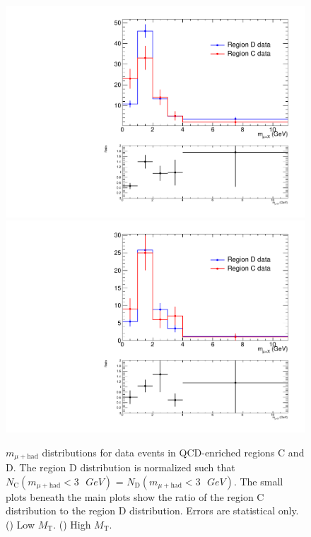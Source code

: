 \begin{figure}[hbtp]
  \begin{center}
    \includegraphics[width=\cmsFigWidth]{figures/regCDataVsRegDData_lowMT}
    \includegraphics[width=\cmsFigWidth]{figures/regCDataVsRegDData_highMT}
    \caption{$m_{\mu+\text{had}}$ distributions for data events in QCD-enriched regions C and D.  The region D distribution is normalized such that $N_{\text{C}}(m_{\mu+\text{had}} < 3\text{ }GeV)$ = $N_{\text{D}}(m_{\mu+\text{had}} < 3\text{ }GeV)$.  The small plots beneath the main plots show the ratio of the region C distribution to the region D distribution.  Errors are statistical only.  (\cmsLeft) Low $M_{\text{T}}$.  (\cmsRight) High $M_{\text{T}}$.}
    \label{fig:regs-C-vs-D}
  \end{center}
\end{figure}

